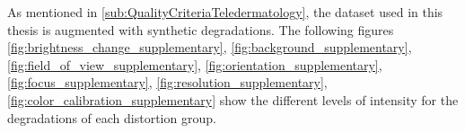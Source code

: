 As mentioned in \autoref{sub:QualityCriteriaTeledermatology}, the dataset used in this thesis is augmented with synthetic degradations. The following figures
\autoref{fig:brightness_change_supplementary}, 
\autoref{fig:background_supplementary}, 
\autoref{fig:field_of_view_supplementary}, 
\autoref{fig:orientation_supplementary}, 
\autoref{fig:focus_supplementary}, 
\autoref{fig:resolution_supplementary}, 
\autoref{fig:color_calibration_supplementary}
  show the different levels of intensity for the degradations of each distortion group. 
\begin{figure}
    \centering
    \setlength{\tabcolsep}{1pt}
    \Large
\end{figure}
